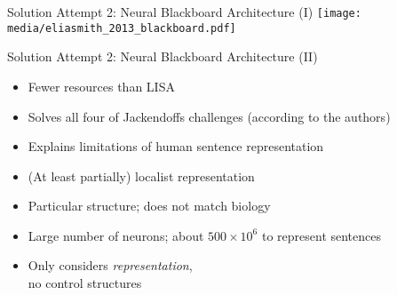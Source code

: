 \documentclass[handout,aspectratio=169]{beamer}
\begin{document}
	\begin{frame}{Solution Attempt 2: Neural Blackboard Architecture (I)}
		\centering
		\texttt{[image: media/eliasmith\_2013\_blackboard.pdf]}
	\end{frame}

	\begin{frame}{Solution Attempt 2: Neural Blackboard Architecture (II)}
		\centering
		\begin{multicols}{2}
			\begin{itemize}
				\setlength{\itemsep}{0.33cm}
				\item[\OPlus] Fewer resources than LISA
				\item[\OPlus] Solves all four of Jackendoffs challenges (according to the authors)
				\item[\OPlus] Explains limitations of human sentence representation
				\item[\OMeh] (At least partially) localist representation
				\columnbreak
				\item[\OMinus] Particular structure; does not match biology
				\item[\OMinus] Large number of neurons; about $500\times 10^6$ to represent sentences
				\item[\OMinus] Only considers \emph{representation},\\no control structures
			\end{itemize}
		\end{multicols}
	\end{frame}
\end{document}
